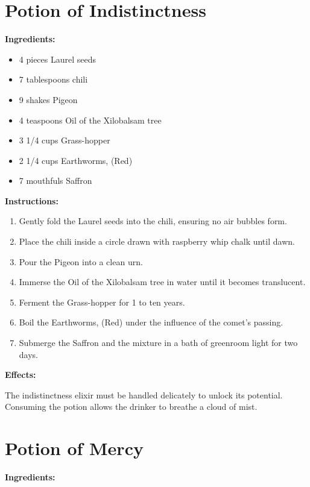 \documentclass{article}
\begin{document}
\newpage
\section*{Potion of Indistinctness}

\textbf{Ingredients:}

\begin{itemize}
  \item 4 pieces Laurel seeds
  \item 7 tablespoons chili
  \item 9 shakes Pigeon
  \item 4 teaspoons Oil of the Xilobalsam tree
  \item 3 1/4 cups Grass-hopper
  \item 2 1/4 cups Earthworms, (Red)
  \item 7 mouthfuls Saffron
\end{itemize}

\textbf{Instructions:}

\begin{enumerate}
  \item Gently fold the Laurel seeds into the chili, ensuring no air bubbles form.
  \item Place the chili inside a circle drawn with raspberry whip chalk until dawn.
  \item Pour the Pigeon into a clean urn.
  \item Immerse the Oil of the Xilobalsam tree in water until it becomes translucent.
  \item Ferment the Grass-hopper for 1 to ten years.
  \item Boil the Earthworms, (Red) under the influence of the comet’s passing.
  \item Submerge the Saffron and the mixture in a bath of greenroom light for two days.
\end{enumerate}

\textbf{Effects:}

The indistinctness elixir must be handled delicately to unlock its potential. Consuming the potion allows the drinker to breathe a cloud of mist.

\newpage
\section*{Potion of Mercy}

\textbf{Ingredients:}
\end{document}
